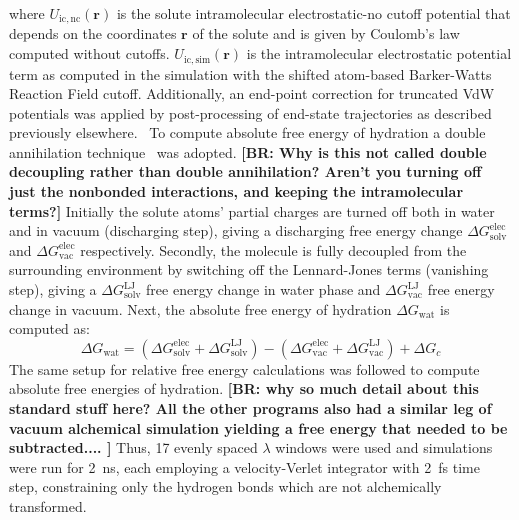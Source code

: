 \documentclass[journal=jctcce,manuscript=article]{achemso}
\begin{document}
{\begin{equation}
\end{equation}
where $U_{\mathrm{ic,nc}}(\mathbf{r})$ is the solute intramolecular electrostatic-no cutoff potential that depends on the coordinates $\mathbf{r}$ of the solute and is given by Coulomb's law computed without cutoffs. 
$U_{\mathrm{ic,sim}}(\mathbf{r})$ is the intramolecular electrostatic potential term as computed in the simulation with the shifted atom-based Barker-Watts Reaction Field cutoff. 
Additionally, an end-point correction for truncated VdW potentials was applied by post-processing of end-state trajectories as described previously elsewhere.~\cite{shirtsLRC,BosisioHG}
%
To compute absolute free energy of hydration a double annihilation technique~\cite{jorgensen1988efficient,GILSON19971047,Bosisio2016} was adopted. 
{\footnotesize \bf \color{red}[BR: Why is this not called double decoupling rather than double annihilation? Aren't you turning off just the nonbonded interactions, and keeping the intramolecular terms?]}
Initially the solute atoms' partial charges are turned off both in water and in vacuum (discharging step), giving a discharging
free energy change $\Delta G_\mathrm{solv}^\mathrm{elec}$ and $\Delta G_\mathrm{vac}^\mathrm{elec}$ respectively. 
Secondly, the molecule is fully decoupled from the surrounding environment by switching  off the Lennard-Jones terms (vanishing step), 
giving a $\Delta G_\mathrm{solv}^\mathrm{LJ}$ free energy change in water phase and $\Delta G_\mathrm{vac}^\mathrm{LJ}$ free energy change in vacuum. 
Next, the absolute free energy of hydration $\Delta G_\mathrm{wat}$ is computed as:
\begin{equation}
\label{eq:absolutehyd}
\Delta G_\mathrm{wat} = (\Delta G_\mathrm{solv}^\mathrm{elec} + \Delta G_\mathrm{solv}^\mathrm{LJ}) - (\Delta G_\mathrm{vac}^\mathrm{elec} + \Delta G_\mathrm{vac}^\mathrm{LJ}) + \Delta G_c
\end{equation}
The same setup for relative free energy calculations was followed to compute absolute free energies of hydration. 
{\footnotesize \bf \color{red}[BR: why so much detail about this standard stuff here? All the other programs also had a similar leg of vacuum alchemical simulation yielding a free energy that needed to be subtracted.... ]}
Thus, 17 evenly spaced $\lambda$ windows were used and simulations were run for \SI{2}{ns},
each employing a velocity-Verlet integrator with \SI{2}{fs} time step, constraining only the hydrogen bonds which are not alchemically transformed. 
}
\iffalse
\end{document}
